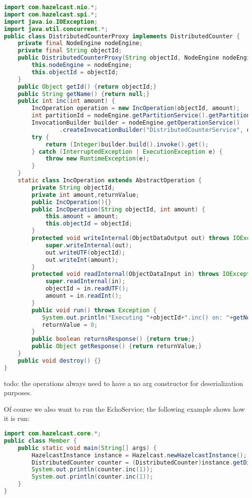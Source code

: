 \begin{lstlisting}[language=java]
import com.hazelcast.nio.*;
import com.hazelcast.spi.*;
import java.io.IOException;
import java.util.concurrent.*;
public class DistributedCounterProxy implements DistributedCounter {
    private final NodeEngine nodeEngine;
    private final String objectId;
    public DistributedCounterProxy(String objectId, NodeEngine nodeEngine) {
        this.nodeEngine = nodeEngine;
        this.objectId = objectId;
    }
    public Object getId() {return objectId;}
    public String getName() {return null;}
    public int inc(int amount) {
        IncOperation operation = new IncOperation(objectId, amount);
        int partitionId = nodeEngine.getPartitionService().getPartitionId(objectId);
        InvocationBuilder builder = nodeEngine.getOperationService()
                .createInvocationBuilder("DistributedCounterService", operation, partitionId);
        try {
            return (Integer)builder.build().invoke().get();
        } catch (InterruptedException | ExecutionException e) {
            throw new RuntimeException(e);
        }
    }
    static class IncOperation extends AbstractOperation {
        private String objectId;
        private int amount,returnValue;
        public IncOperation(){}
        public IncOperation(String objectId, int amount) {
            this.amount = amount;
            this.objectId = objectId;
        }
        protected void writeInternal(ObjectDataOutput out) throws IOException {
            super.writeInternal(out);
            out.writeUTF(objectId);
            out.writeInt(amount);
        }
        protected void readInternal(ObjectDataInput in) throws IOException {
            super.readInternal(in);
            objectId = in.readUTF();
            amount = in.readInt();
        }
        public void run() throws Exception {
           System.out.println("Executing "+objectId+".inc() on: "+getNodeEngine().getThisAddress());            
           returnValue = 0;
        }
        public boolean returnsResponse() {return true;}
        public Object getResponse() {return returnValue;}
    }
    public void destroy() {}
}
\end{lstlisting}
todo: the operations always need to have a no arg constructor for deserialization purposes.

Of course we also want to run the EchoService; the following example shows how it is run:
\begin{lstlisting}[language=java]
import com.hazelcast.core.*;
public class Member {
    public static void main(String[] args) {
        HazelcastInstance instance = Hazelcast.newHazelcastInstance();
        DistributedCounter counter = (DistributedCounter)instance.getDistributedObject("DistributedCounterService","counter1");
        System.out.println(counter.inc(1));
        System.out.println(counter.inc(1));
    }
}
\end{lstlisting}

